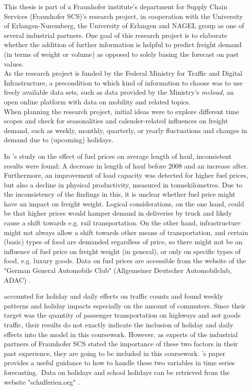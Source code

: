 \documentclass[a4paper, 11pt]{article}
\begin{document}
This thesis is part of a Fraunhofer institute's department for Supply Chain Services (Fraunhofer SCS)'s research project, in cooperation with the University of Erlangen-Nuremberg, the University of Erlangen and NAGEL group as one of several industrial partners. 
One goal of this research project is to elaborate whether the addition of further information is helpful to predict freight demand (in terms of weight or volume) as opposed to solely basing the forecast on past values.\\
As the research project is funded by the Federal Ministry for Traffic and Digital Infrastructure, a precondition to which kind of information to choose was to use freely available data sets, such as data provided by the Ministry's \textit{mcloud}, an open online platform with data on mobility and related topics. \\
When planning the research project, initial ideas were to explore different time scopes and check for seasonalities and calender-related influences on freight demand, such as weekly, monthly, quarterly, or yearly fluctuations and changes in demand due to (upcoming) holidays. \

In \cite{Abate.2014}'s study on the effect of fuel prices on average length of haul, inconsistent results were found: A decrease in length of haul before 2008 and an increase after. Furthermore, an improvement of load capacity was detected for higher fuel prices, but also a decline in physical productivity, measured in tonnekilometres.
Due to the inconsistency of the findings in this, it is unclear whether fuel price might have an impact on freight weight. Logical considerations, on the one hand, could be that higher prices would hamper demand in deliveries by truck and likely cause a shift towards e.g. rail transportation. On the other hand, infrastructure might not always allow a shift towards other means of transportation, and certain (basic) types of food are demanded regardless of price, so there might not be an influence of fuel price on freight weight (in general), or only on specific types of food, e.g. luxury goods.
Data on fuel prices are accessible from the website of the "German General Automobile Club" (Allgemeiner Deutscher Automobilclub, ADAC) \citep{ADAC.}.\

\cite{Cools.2009} accounted for holiday and daily effects on traffic counts and found weekly patterns and holiday impacts especially on the amount of commuters. Since their target was the quantity of passenger transportation on highways and not goods traffic, their results do not exactly indicate the inclusion of holiday and daily effects into the model in this coursework. However, as experts of the industrial partners of Fraunhofer SCS stated the importance of these two factors in their past experience, they are going to be included in this coursework. \cite{Cools.2009}'s paper provides a useful guidance to how to handle these two variables in time series forecasting.\
Data on holidays and school holidays can be retrieved from the website "schulferien.org" \citep{.b}.\\
\end{document}
